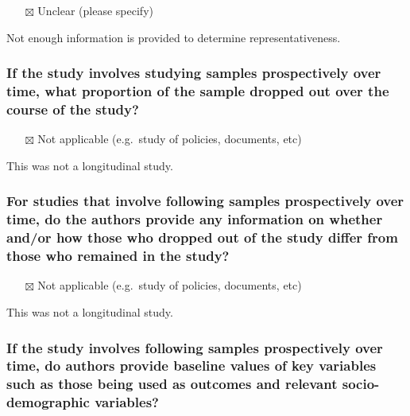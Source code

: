 \documentclass[
  doc, a4paper]{apa7}
\providecommand{\tightlist}{%
  \setlength{\itemsep}{0pt}\setlength{\parskip}{0pt}}
\begin{document}
\begin{itemize}
\tightlist
\item[$\boxtimes$]
  Unclear (please specify)
\end{itemize}

Not enough information is provided to determine representativeness.

\subsubsection{If the study involves studying samples prospectively over time, what proportion of the sample dropped out over the course of the study?}\label{if-the-study-involves-studying-samples-prospectively-over-time-what-proportion-of-the-sample-dropped-out-over-the-course-of-the-study}

\begin{itemize}
\tightlist
\item[$\boxtimes$]
  Not applicable (e.g.~study of policies, documents, etc)
\end{itemize}

This was not a longitudinal study.

\subsubsection{For studies that involve following samples prospectively over time, do the authors provide any information on whether and/or how those who dropped out of the study differ from those who remained in the study?}\label{for-studies-that-involve-following-samples-prospectively-over-time-do-the-authors-provide-any-information-on-whether-andor-how-those-who-dropped-out-of-the-study-differ-from-those-who-remained-in-the-study}

\begin{itemize}
\tightlist
\item[$\boxtimes$]
  Not applicable (e.g.~study of policies, documents, etc)
\end{itemize}

This was not a longitudinal study.

\subsubsection{If the study involves following samples prospectively over time, do authors provide baseline values of key variables such as those being used as outcomes and relevant socio-demographic variables?}\label{if-the-study-involves-following-samples-prospectively-over-time-do-authors-provide-baseline-values-of-key-variables-such-as-those-being-used-as-outcomes-and-relevant-socio-demographic-variables}
\end{document}
